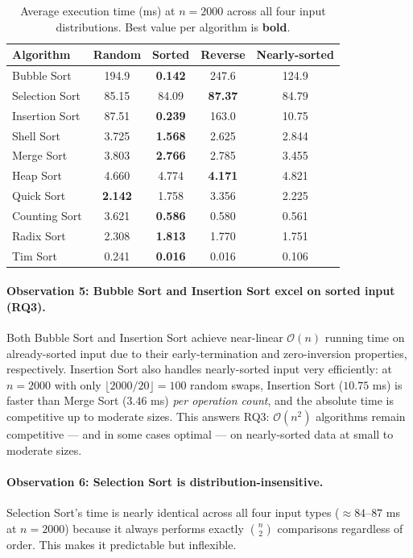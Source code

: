 \documentclass[11pt,a4paper]{article}
\begin{document}
\begin{table}[H]
\centering
\caption{Average execution time (ms) at $n = 2000$ across all four input distributions.
  Best value per algorithm is \textbf{bold}.}
\label{tab:distributions}
\small
\renewcommand{\arraystretch}{1.2}
\begin{tabular}{@{}lcccc@{}}
\toprule
\textbf{Algorithm} & \textbf{Random} & \textbf{Sorted} & \textbf{Reverse} & \textbf{Nearly-sorted} \\
\midrule
Bubble Sort    & 194.9 & \textbf{0.142} & 247.6  & 124.9 \\
Selection Sort & 85.15 & 84.09 & \textbf{87.37}  & 84.79 \\
Insertion Sort & 87.51 & \textbf{0.239} & 163.0  & 10.75 \\
Shell Sort     & 3.725 & \textbf{1.568} & 2.625  & 2.844 \\
Merge Sort     & 3.803 & \textbf{2.766} & 2.785  & 3.455 \\
Heap Sort      & 4.660 & 4.774 & \textbf{4.171}  & 4.821 \\
Quick Sort     & \textbf{2.142} & 1.758 & 3.356  & 2.225 \\
Counting Sort  & 3.621 & \textbf{0.586} & 0.580  & 0.561 \\
Radix Sort     & 2.308 & \textbf{1.813} & 1.770  & 1.751 \\
Tim Sort       & 0.241 & \textbf{0.016} & 0.016  & 0.106 \\
\bottomrule
\end{tabular}
\end{table}

\paragraph{Observation 5: Bubble Sort and Insertion Sort excel on sorted input (RQ3).}
Both Bubble Sort and Insertion Sort achieve near-linear $\mathcal{O}(n)$ running time
on already-sorted input due to their early-termination and zero-inversion properties,
respectively.
Insertion Sort also handles nearly-sorted input very efficiently: at $n = 2000$ with
only $\lfloor 2000/20 \rfloor = 100$ random swaps, Insertion Sort ($10.75$ ms) is
faster than Merge Sort ($3.46$ ms) \emph{per operation count}, and the absolute time
is competitive up to moderate sizes.
This answers RQ3: $\mathcal{O}(n^2)$ algorithms remain competitive — and in some cases
optimal — on nearly-sorted data at small to moderate sizes.

\paragraph{Observation 6: Selection Sort is distribution-insensitive.}
Selection Sort's time is nearly identical across all four input types
($\approx 84$--$87$ ms at $n = 2000$) because it always performs exactly
$\binom{n}{2}$ comparisons regardless of order.
This makes it predictable but inflexible.
\end{document}
